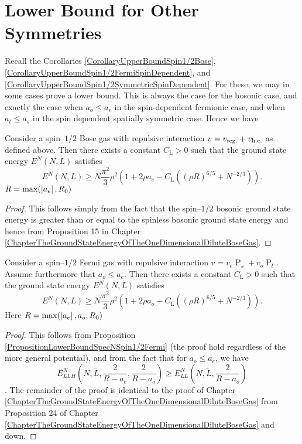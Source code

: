 \section{Lower Bound for Other Symmetries}
Recall the Corollaries \ref{CorollaryUpperBoundSpin1/2Bose}, \ref{CorollaryUpperBoundSpin1/2FermiSpinDependent}, and \ref{CorollaryUpperBoundSpin1/2SymmetricSpinDependent}. For these, we may in some cases prove a lower bound. This is always the case for the bosonic case, and exactly the case when $ a_o\leq a_e $ in the spin-dependent fermionic case, and when $ a_t\leq a_s $ in the spin dependent spatially symmetric case. Hence we have 
\begin{theorem}
	\label{TheoremLowerBoundSpin1/2Bose}
	Consider a spin--$ 1/2 $ Bose gas with repulsive interaction  $v=v_{\textnormal{reg.}}+v_{\textnormal{h.c.}}$ as defined above. Then there exists a constant $C_\text{L}>0$ such that the ground state energy $E^N(N,L)$ satisfies
	\begin{equation}
	\label{eqlowerSpin1/2Bose}
	E^N(N,L)\geq N\frac{\pi^2}{3}\rho^2\left(1+2\rho a_e-C_\text{L}\left((\rho R)^{6/5}+N^{-2/3}\right)\right).
	\end{equation}
	$ R=\max(\left\lvert a_e \right\rvert, R_0) $
\end{theorem}
\begin{proof}
	This follows simply from the fact that the spin--$ 1/2$ bosonic ground state energy is greater than or equal to the spinless bosonic ground state energy and hence from Proposition 15 in Chapter \ref{ChapterTheGroundStateEnergyOfTheOneDimensionalDiluteBoseGas}.
\end{proof}
	\begin{theorem}
	\label{TheoremLowerBoundSpinDependentSpin1/2Fermi}
	Consider a spin--$ 1/2 $ Fermi gas with repulsive interaction  $v=v_e\operatorname{P}_s+v_o\operatorname{P}_t$. Assume furthermore that $ a_o\leq a_e $. Then there exists a constant $C_\text{L}>0$ such that the ground state energy $E^N(N,L)$ satisfies
	\begin{equation}
	\label{eqlowerSpinDependtSpin1/2Fermi}
	E^N(N,L)\geq N\frac{\pi^2}{3}\rho^2\left(1+2\rho a_o-C_\text{L}\left((\rho R)^{6/5}+N^{-2/3}\right)\right).
	\end{equation}
	Here $ R=\max(\left\lvert a_e \right\rvert, a_o, R_0) $
\end{theorem}
\begin{proof}
	This follows from Proposition \ref{PropositionLowerBoundSpecNSpin1/2Fermi} (the proof hold regardless of the more general potential), and from the fact that for $ a_o\leq a_e $, we have $$ E_{LLH}^N\left(N,\tilde{L},\frac{2}{R-a_e},\frac{2}{R-a_o}\right)\geq E^N_{LL}\left(N,\tilde{L},\frac{2}{R-a_o}\right) $$. The remainder of the proof is identical to the proof of Chapter \ref{ChapterTheGroundStateEnergyOfTheOneDimensionalDiluteBoseGas} from Proposition 24 of Chapter \ref{ChapterTheGroundStateEnergyOfTheOneDimensionalDiluteBoseGas} and down.
\end{proof}
